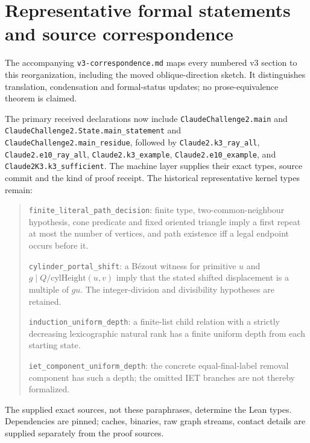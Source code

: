 \documentclass[11pt]{amsart}
\newcommand{\record}[1]{\nolinkurl{#1}}
\theoremstyle{definition}\newtheorem{definition}{Definition}
\begin{document}
\section{Representative formal statements and source correspondence}\label{app:correspondence}
The accompanying \record{v3-correspondence.md} maps every numbered v3
section to this reorganization, including the moved oblique-direction
sketch. It distinguishes translation, condensation and formal-status
updates; no prose-equivalence theorem is claimed.

The primary received declarations now include
\record{ClaudeChallenge2.main} and
\record{ClaudeChallenge2.State.main_statement} and
\record{ClaudeChallenge2.main_residue}, followed by
\record{Claude2.k3_ray_all}, \record{Claude2.e10_ray_all},
\record{Claude2.k3_example}, \record{Claude2.e10_example}, and
\record{Claude2K3.k3_sufficient}. The machine layer supplies their exact
types, source commit and the kind of proof receipt. The historical
representative kernel types remain:
\begin{quote}\small
\record{finite_literal_path_decision}: finite type, two-common-neighbour
hypothesis, cone predicate and fixed oriented triangle imply a first
repeat at most the number of vertices, and path existence iff a legal
endpoint occurs before it.\par
\record{cylinder_portal_shift}: a B\'ezout witness for primitive $u$
and $g\mid Q/\mathrm{cylHeight}(u,v)$ imply that the stated shifted
displacement is a multiple of $gu$. The integer-division and
divisibility hypotheses are retained.\par
\record{induction_uniform_depth}: a finite-list child relation with a
strictly decreasing lexicographic natural rank has a finite uniform
depth from each starting state.\par
\record{iet_component_uniform_depth}: the concrete equal-final-label
removal component has such a depth; the omitted IET branches are not
thereby formalized.
\end{quote}
The supplied exact sources, not these paraphrases, determine the Lean
types. Dependencies are pinned; caches, binaries, raw graph streams,
contact details are supplied separately from the proof sources.
\end{document}
